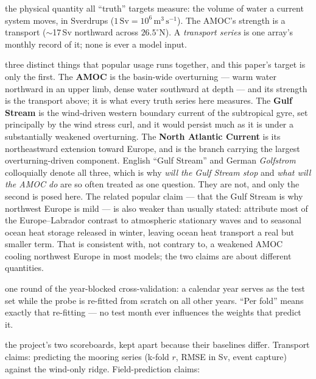 \documentclass[10pt]{article}
\begin{document}
\begin{description}\itemsep2pt
\item[Transport] the physical quantity all ``truth'' targets measure: the
  volume of water a current system moves, in Sverdrups
  ($1\,\mathrm{Sv}=10^6\,\mathrm{m^3\,s^{-1}}$). The AMOC's strength is
  a transport ($\sim$17\,Sv northward across $26.5^\circ$N). A
  \emph{transport series} is one array's monthly record of it; none is
  ever a model input.
\item[AMOC vs.\ Gulf Stream vs.\ North Atlantic Current] three distinct
  things that popular usage runs together, and this paper's target is
  only the first. The \textbf{AMOC} is the basin-wide overturning ---
  warm water northward in an upper limb, dense water southward at depth
  --- and its strength is the transport above; it is what every truth
  series here measures. The \textbf{Gulf Stream} is the wind-driven
  western boundary current of the subtropical gyre, set principally by
  the wind stress curl, and it would persist much as it is under a
  substantially weakened overturning. The \textbf{North Atlantic
  Current} is its northeastward extension toward Europe, and is the
  branch carrying the largest overturning-driven component. English
  ``Gulf Stream'' and German \emph{Golfstrom} colloquially denote all
  three, which is why \emph{will the Gulf Stream stop} and \emph{what
  will the AMOC do} are so often treated as one question. They are not,
  and only the second is posed here. The related popular claim --- that
  the Gulf Stream is why northwest Europe is mild --- is also weaker
  than usually stated: \cite{seager2002} attribute most of the
  Europe--Labrador contrast to atmospheric stationary waves and to
  seasonal ocean heat storage released in winter, leaving ocean heat
  transport a real but smaller term. That is consistent with, not
  contrary to, a weakened AMOC cooling northwest Europe in most models;
  the two claims are about different quantities.
\item[Fold] one round of the year-blocked cross-validation: a calendar
  year serves as the test set while the probe is re-fitted from scratch
  on all other years. ``Per fold'' means exactly that re-fitting — no
  test month ever influences the weights that predict it.
\item[Transport claims / field-prediction claims] the project's two
  scoreboards, kept apart because their baselines differ. Transport
  claims: predicting the mooring series (k-fold $r$, RMSE in Sv, event
  capture) against the wind-only ridge. Field-prediction claims:

\end{description}
\end{document}
